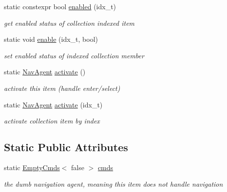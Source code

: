 \begin{DoxyCompactItemize}
static constexpr bool \hyperlink{structEmpty_adc2d105531fb7b43f60fcd9deaaaa71c}{enabled} (idx\+\_\+t)
\begin{DoxyCompactList}\small\item\em get enabled status of collection indexed item \end{DoxyCompactList}\item 
\mbox{\label{structEmpty_af4997efbad97edae86108c77b4b0f26a}} 
static void \hyperlink{structEmpty_af4997efbad97edae86108c77b4b0f26a}{enable} (idx\+\_\+t, bool)
\begin{DoxyCompactList}\small\item\em set enabled status of indexed collection member \end{DoxyCompactList}\item 
static \hyperlink{structNavAgent}{Nav\+Agent} \hyperlink{group__Agents_gade3cccf531dad6fe907c3a9764204e1c}{activate} ()
\begin{DoxyCompactList}\small\item\em activate this item (handle enter/select) \end{DoxyCompactList}\item 
\mbox{\label{structEmpty_aa8f5921ff6030b0b4eebde9f51214fd2}} 
static \hyperlink{structNavAgent}{Nav\+Agent} \hyperlink{structEmpty_aa8f5921ff6030b0b4eebde9f51214fd2}{activate} (idx\+\_\+t)
\begin{DoxyCompactList}\small\item\em activate collection item by index \end{DoxyCompactList}\end{DoxyCompactItemize}
\subsection*{Static Public Attributes}
\begin{DoxyCompactItemize}
\item 
\mbox{\label{structEmpty_ab68c571bf6950d7c715002f4bd2873d7}} 
static \hyperlink{structEmptyCmds}{Empty\+Cmds}$<$ false $>$ \hyperlink{structEmpty_ab68c571bf6950d7c715002f4bd2873d7}{cmds}
\begin{DoxyCompactList}\small\item\em the dumb navigation agent, meaning this item does not handle navigation \end{DoxyCompactList}\end{DoxyCompactItemize}


